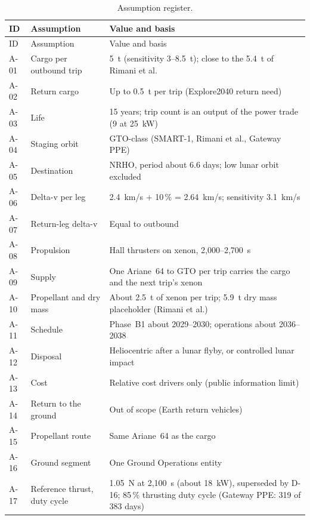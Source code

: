 \documentclass[11pt,a4paper]{article}
\newcommand{\id}[1]{#1}
\begin{document}
{\small
\setlength{\LTpre}{2pt}\setlength{\LTpost}{6pt}
\begin{longtable}{@{}P{1.0cm}P{4.3cm}P{9.8cm}@{}}
\caption{Assumption register.}\label{tab:assumptions}\\
\toprule
ID & Assumption & Value and basis \\
\midrule\endfirsthead
\toprule ID & Assumption & Value and basis \\ \midrule\endhead
\bottomrule\endfoot
\id{A-01} & Cargo per outbound trip & 5~t (sensitivity 3--8.5~t); close to the 5.4~t of Rimani et al. \\
\id{A-02} & Return cargo & Up to 0.5~t per trip (Explore2040 return need) \\
\id{A-03} & Life & 15 years; trip count is an output of the power trade (9 at 25~kW) \\
\id{A-04} & Staging orbit & GTO-class (SMART-1, Rimani et al., Gateway PPE) \\
\id{A-05} & Destination & NRHO, period about 6.6 days; low lunar orbit excluded \\
\id{A-06} & Delta-v per leg & 2.4~km/s + 10\,\% = 2.64~km/s; sensitivity 3.1~km/s \\
\id{A-07} & Return-leg delta-v & Equal to outbound \\
\id{A-08} & Propulsion & Hall thrusters on xenon, 2,000--2,700~s \\
\id{A-09} & Supply & One Ariane~64 to GTO per trip carries the cargo and the next trip's xenon \\
\id{A-10} & Propellant and dry mass & About 2.5~t of xenon per trip; 5.9~t dry mass placeholder (Rimani et al.) \\
\id{A-11} & Schedule & Phase~B1 about 2029--2030; operations about 2036--2038 \\
\id{A-12} & Disposal & Heliocentric after a lunar flyby, or controlled lunar impact \\
\id{A-13} & Cost & Relative cost drivers only (public information limit) \\
\id{A-14} & Return to the ground & Out of scope (Earth return vehicles) \\
\id{A-15} & Propellant route & Same Ariane~64 as the cargo \\
\id{A-16} & Ground segment & One Ground Operations entity \\
\id{A-17} & Reference thrust, duty cycle & 1.05~N at 2,100~s (about 18~kW), superseded by \id{D-16}; 85\,\% thrusting duty cycle (Gateway PPE: 319 of 383 days) \\

\end{longtable}}
\end{document}
